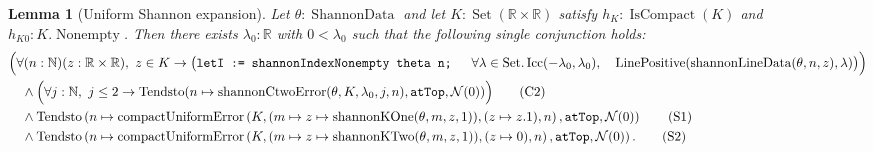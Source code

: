 \documentclass[9pt]{extarticle}
\newtheorem{lemma}{Lemma}[section]
\theoremstyle{definition}
\theoremstyle{remark}
\newcommand{\R}{\mathbb R}
\newcommand{\N}{\mathbb N}
\begin{document}
\begin{lemma}[Uniform Shannon expansion]\label{lem:uniform-shannon-expansion}
Let $\theta:\operatorname{ShannonData}$ and let
$K:\operatorname{Set}(\R\times\R)$ satisfy
$h_K:\operatorname{IsCompact}(K)$ and $h_{K0}:K.\operatorname{Nonempty}$.
Then there exists $\lambda_0:\R$ with $0<\lambda_0$ such that the following
single conjunction holds:
\begin{align*}
&\Bigl(\forall(n:\N)(z:\R\times\R),\ z\in K\to
 \bigl(\texttt{letI := shannonIndexNonempty theta n; }\quad
 \forall\lambda\in\operatorname{Set.Icc}(-\lambda_0,\lambda_0),\quad
 \operatorname{LinePositive}
   (\operatorname{shannonLineData}(\theta,n,z),\lambda)\bigr)\Bigr)\\
&\quad\wedge
 \Bigl(\forall j:\N,\ j\leq2\to
  \operatorname{Tendsto}
   (n\mapsto\operatorname{shannonCtwoError}
      (\theta,K,\lambda_0,j,n),\texttt{atTop},\mathcal N(0))\Bigr)
 \tag{C2}\label{eq:shannon-explicit-C2}\\
&\quad\wedge
 \operatorname{Tendsto}
  \left(n\mapsto\operatorname{compactUniformError}
   \left(K,(m\mapsto z\mapsto
    \operatorname{shannonKOne}(\theta,m,z,1)),
    (z\mapsto z.1),n\right),\texttt{atTop},\mathcal N(0)\right)
 \tag{S1}\label{eq:shannon-H1-first}\\
&\quad\wedge
 \operatorname{Tendsto}
  \left(n\mapsto\operatorname{compactUniformError}
   \left(K,(m\mapsto z\mapsto
    \operatorname{shannonKTwo}(\theta,m,z,1)),
    (z\mapsto0),n\right),\texttt{atTop},\mathcal N(0)\right).
 \tag{S2}\label{eq:shannon-H1-second}
\end{align*}
\end{lemma}
\end{document}
